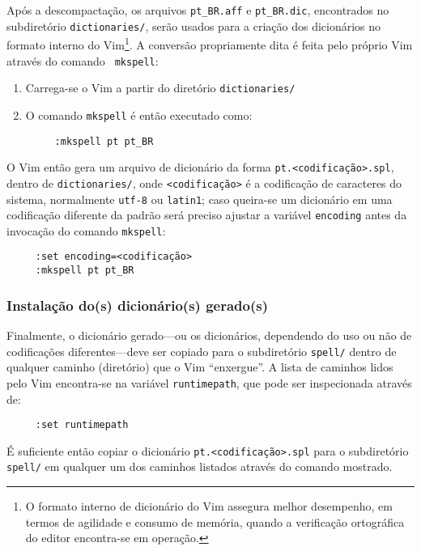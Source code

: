 Após a descompactação, os arquivos \verb|pt_BR.aff| e \verb|pt_BR.dic|,
encontrados no subdiretório {\tt dictionaries/}, serão usados para a criação
dos dicionários no formato interno do Vim\footnote{O formato interno de dicionário
do Vim assegura melhor desempenho, em termos de agilidade e consumo de
memória, quando a verificação ortográfica do editor encontra-se em operação.}.
A conversão propriamente dita é feita pelo próprio Vim através do comando {\tt
mkspell}:

\begin{enumerate}
\item Carrega-se o Vim a partir do diretório {\tt dictionaries/}
\item O comando {\tt mkspell} é então executado como:
\begin{verbatim}
     :mkspell pt pt_BR
\end{verbatim}
\end{enumerate}

O Vim então gera um arquivo de dicionário da forma
\verb|pt.<codificação>.spl|, dentro de {\tt dictionaries/}, onde
\verb|<codificação>| é a codificação de caracteres do sistema, normalmente
\verb|utf-8| ou \verb|latin1|; caso queira-se um dicionário em uma codificação
diferente da padrão será preciso ajustar a variável {\tt encoding} antes da
invocação do comando {\tt mkspell}:

\begin{verbatim}
     :set encoding=<codificação>
     :mkspell pt pt_BR
\end{verbatim}

\subsubsection{Instalação do(s) dicionário(s) gerado(s)}

Finalmente, o dicionário gerado---ou os dicionários, dependendo do uso ou não
de codificações diferentes---deve ser copiado para o subdiretório {\tt spell/}
dentro de qualquer caminho (diretório) que o Vim ``enxergue''. A lista de
caminhos lidos pelo Vim encontra-se na variável {\tt runtimepath}, que pode
ser inspecionada através de:

\begin{verbatim}
     :set runtimepath
\end{verbatim}

É suficiente então copiar o dicionário \verb|pt.<codificação>.spl| para o
subdiretório {\tt spell/} em qualquer um dos caminhos listados através do
comando mostrado. 

